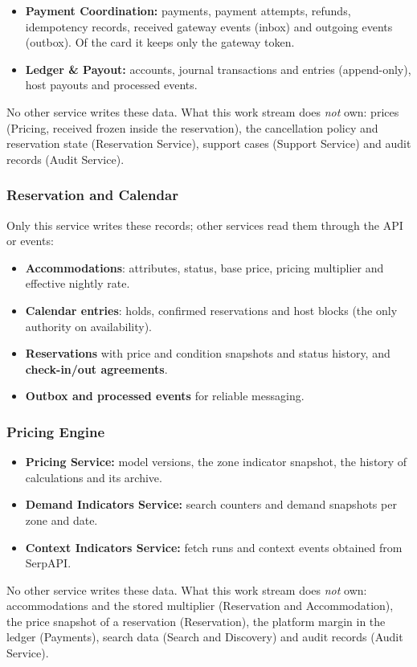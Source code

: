 \begin{itemize}
  \item \textbf{Payment Coordination:} payments, payment attempts, refunds,
    idempotency records, received gateway events (inbox) and outgoing events
    (outbox). Of the card it keeps only the gateway token.
  \item \textbf{Ledger \& Payout:} accounts, journal transactions and entries
    (append-only), host payouts and processed events.
\end{itemize}
No other service writes these data. What this work stream does \emph{not}
own: prices (Pricing, received frozen inside the reservation), the
cancellation policy and reservation state (Reservation Service), support
cases (Support Service) and audit records (Audit Service).


\subsubsection{Reservation and Calendar}
Only this service writes these records; other services read them through the
API or events:
\begin{itemize}
  \item \textbf{Accommodations}: attributes, status, base price, pricing
    multiplier and effective nightly rate.
  \item \textbf{Calendar entries}: holds, confirmed reservations and host
    blocks (the only authority on availability).
  \item \textbf{Reservations} with price and condition snapshots and status
    history, and \textbf{check-in/out agreements}.
  \item \textbf{Outbox and processed events} for reliable messaging.
\end{itemize}

\begingroup
\setlength{\emergencystretch}{3em}
\subsubsection{Pricing Engine}
\label{sec:price-owned}

\begin{itemize}
  \item \textbf{Pricing Service:} model versions, the zone indicator snapshot,
    the history of calculations and its archive.
  \item \textbf{Demand Indicators Service:} search counters and demand
    snapshots per zone and date.
  \item \textbf{Context Indicators Service:} fetch runs and context events
    obtained from SerpAPI.
\end{itemize}
No other service writes these data. What this work stream does \emph{not}
own: accommodations and the stored multiplier (Reservation and
Accommodation), the price snapshot of a reservation (Reservation), the
platform margin in the ledger (Payments), search data (Search and Discovery)
and audit records (Audit Service).
\endgroup

